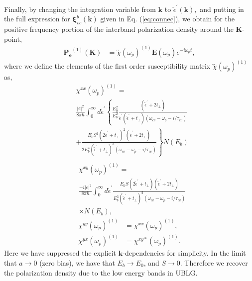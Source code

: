 \documentclass[twocolumn,secnumarabic,amssymb, nobibnotes, aps, prd, superscriptaddress]{revtex4-1}
\begin{document}
Finally, by changing the integration variable from $\mathbf{k}$ to $\tilde{\epsilon}^{\prime}(\mathbf{k}),$ and putting in the full expression for $\mathbf{\xi}_{vc}^{b}(\mathbf{k})$ given in Eq. (\ref{eq:connec}), we obtain for the positive frequency portion of the interband polarization density around the $\mathbf{K}$-point,
\begin{equation}
\begin{aligned}\mathbf{P_{e}}^{(1)}(\mathbf{K}) & =\overleftrightarrow{\chi}(\omega_{p})^{(1)}\mathbf{E}\left(\omega_{p}\right)e^{-i\omega_{p}t},\end{aligned}\label{eq:323}
\end{equation}
where we define the elements of the first order susceptibility matrix $\overleftrightarrow{\chi}(\omega_{p})^{(1)}$ as,
\begin{equation}
\begin{aligned}& \chi^{xx}(\omega_{p})^{(1)} =\\ & \frac{|e|^{2}}{8\pi\hbar}\int_{0}^{\infty}d\tilde{\epsilon}^{\prime}\left\{ \frac{E_{0}^{2}}{E_{b}^{2}}\frac{\left(\tilde{\epsilon}^{\prime}+2t_{\perp}\right)}{\tilde{\epsilon}^{\prime}\left(\tilde{\epsilon}^{\prime}+t_{\perp}\right)\left(\omega_{cv}-\omega_{p}-i/\tau_{cv}\right)}\right.\\
 & +\left.\frac{E_{0}S^{2}\left(2\tilde{\epsilon}^{\prime}+t_{\perp}\right)^{2}\left(\tilde{\epsilon}^{\prime}+2t_{\perp}\right)}{2E_{b}^{4}\left(\tilde{\epsilon}^{\prime}+t_{\perp}\right)^{3}\left(\omega_{cv}-\omega_{p}-i/\tau_{cv}\right)}\right\}N(E_b) \\
\end{aligned}\label{eq:susp1}
\end{equation}
\begin{equation}
\begin{aligned}& \chi^{xy}(\omega_{p})^{(1)} =\\ & \frac{-i|e|^{2}}{8\pi\hbar}\int_{0}^{\infty}d\tilde{\epsilon}^{\prime}\frac{E_{0}S\left(2\tilde{\epsilon}^{\prime}+t_{\perp}\right)\left(\tilde{\epsilon}^{\prime}+2t_{\perp}\right)}{E_{b}^{3}\left(\tilde{\epsilon}^{\prime}+t_{\perp}\right)^{2}\left(\omega_{cv}-\omega_{p}-i/\tau_{cv}\right)}\\
 & \times N(E_b),
\end{aligned}
\end{equation}
\begin{equation}
\begin{array}{cc}
\chi^{yy}(\omega_{p})^{(1)} & =\chi^{xx}(\omega_{p})^{(1)},\\
\chi^{yx}(\omega_{p})^{(1)} & =\chi^{xy*}(\omega_{p})^{(1)}.
\end{array}\label{eq:susp2}
\end{equation}
Here we have suppressed the explicit $\mathbf{k}$-dependencies for simplicity. In the limit that $a\rightarrow0$ (zero bias), we have that $E_{b}\rightarrow E_{0}$, and $S\rightarrow0$. Therefore we recover the polarization density due to the low energy bands in UBLG\cite{mcgouran2016nonlinear}. 
\end{document}
